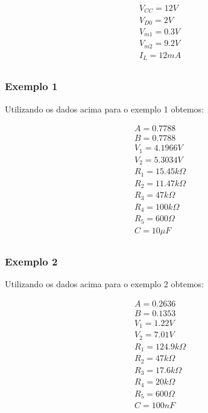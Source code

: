 \begin{equation}
    \begin{aligned}
         & V_{CC} = 12 V  \\
         & V_{D0} = 2 V   \\
         & V_{m1} = 0.3 V \\
         & V_{m2} = 9.2 V \\
         & I_L = 12 mA    \\
    \end{aligned}
\end{equation}

\subsubsection{Exemplo 1}

Utilizando os dados acima para o exemplo 1 obtemos:

\begin{equation}
    \begin{aligned}
         & A = 0.7788             \\
         & B = 0.7788             \\
         & V_1 = 4.1966 V         \\
         & V_2 = 5.3034 V         \\
         & R_1 = 15.45k \varOmega \\
         & R_2 = 11.47k \varOmega \\
         & R_3 = 47k \varOmega    \\
         & R_4 = 100k \varOmega   \\
         & R_5 = 600 \varOmega    \\
         & C = 10 \mu F           \\
    \end{aligned}
\end{equation}

\subsubsection{Exemplo 2}

Utilizando os dados acima para o exemplo 2 obtemos:

\begin{equation}
    \begin{aligned}
         & A = 0.2636             \\
         & B = 0.1353             \\
         & V_1 = 1.22 V           \\
         & V_2 = 7.01 V           \\
         & R_1 = 124.9k \varOmega \\
         & R_2 = 47k \varOmega    \\
         & R_3 = 17.6k \varOmega  \\
         & R_4 = 20k \varOmega    \\
         & R_5 = 600 \varOmega    \\
         & C = 100 nF             \\
    \end{aligned}
\end{equation}